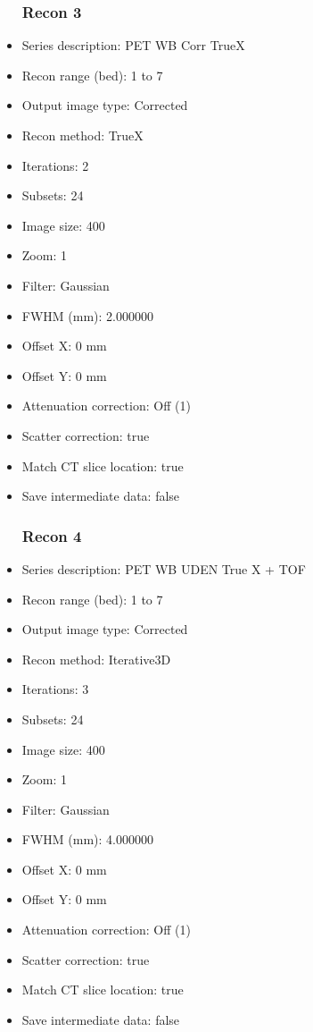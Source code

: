 \documentclass[12pt]{article}
\begin{document}
\begin{itemize}
\subsubsection{Recon 3}
\item Series description: PET WB Corr TrueX
\item Recon range (bed): 1 to 7
\item Output image type: Corrected
\item Recon method: TrueX
\item Iterations: 2
\item Subsets: 24
\item Image size: 400
\item Zoom: 1
\item Filter: Gaussian
\item FWHM (mm): 2.000000
\item Offset X: 0 mm
\item Offset Y: 0 mm
\item Attenuation correction: Off (1)
\item Scatter correction: true
\item Match CT slice location: true
\item Save intermediate data: false
\subsubsection{Recon 4}
\item Series description: PET WB UDEN True X + TOF
\item Recon range (bed): 1 to 7
\item Output image type: Corrected
\item Recon method: Iterative3D
\item Iterations: 3
\item Subsets: 24
\item Image size: 400
\item Zoom: 1
\item Filter: Gaussian
\item FWHM (mm): 4.000000
\item Offset X: 0 mm
\item Offset Y: 0 mm
\item Attenuation correction: Off (1)
\item Scatter correction: true
\item Match CT slice location: true
\item Save intermediate data: false

\end{itemize}
\end{document}
